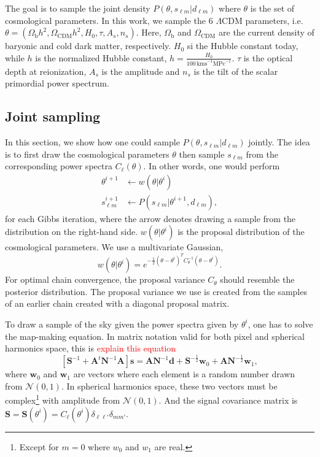 \documentclass[twocolumn]{../common/aa}
\begin{document}
The goal is to sample the joint density $P(\theta, s_{\ell m} | d_{\ell m})$ where $\theta$ is the set of cosmological parameters. In this work, we sample the 6 $\Lambda$CDM parameters, i.e. $\theta=(\Omega_{\textrm{b}}h^2, \Omega_{\textrm{CDM}}h^2, H_0, \tau, A_s, n_s)$. Here, $\Omega_\mathrm{b}$ and $\Omega_\mathrm{CDM}$ are the current density of baryonic and cold dark matter, respectively. $H_0$ si the Hubble constant today, while $h$ is the normalized Hubble constant, $h=\frac{H_0}{100\,\mathrm{km s}^{-1} \mathrm{MPc}^{-1}}$. $\tau$ is the optical depth at reionization, $A_s$ is the amplitude and $n_s$ is the tilt of the scalar primordial power spectrum.

\subsection{Joint sampling}

In this section, we show how one could sample $P(\theta, s_{\ell m} | d_{\ell m})$ jointly. The idea is to first draw the cosmological parameters $\theta$ then sample $s_{\ell m}$ from the corresponding power spectra $C_{\ell}(\theta)$. In other words, one would perform
\begin{align}
    \theta^{i+1} 
 &\leftarrow w(\theta |\theta^i)\\
    s_{\ell m}^{i+1} &\leftarrow P(s_{\ell m} | \theta^{i+1}, d_{\ell m}),
\end{align}
for each Gibbs iteration, where the arrow denotes drawing a sample from the distribution on the right-hand side. $w(\theta |\theta^i)$ is the proposal distribution of the cosmological parameters. We use a multivariate Gaussian,
\begin{equation}
w(\theta |\theta^i) = e^{-\frac12 \left(\theta - \theta^i \right)^T C_{\theta}^{-1}\left(\theta - \theta^i \right)}.
\end{equation}
For optimal chain convergence, the proposal variance $C_{\theta}$ should resemble the posterior distribution. The proposal variance we use is created from the samples of an earlier chain created with a diagonal proposal matrix.

To draw a sample of the sky given the power spectra given by $\theta^i$, one has to solve the map-making equation. In matrix notation valid for both pixel and spherical harmonics space, this is \textcolor{red}{explain this equation}
\begin{equation}
    \label{eq:mapmakingeq}
    \left[\mathbf{S}^{-1} + \mathbf{A}^t \mathbf{N}^{-1}\mathbf{A} \right]\mathbf{s} = \mathbf{A} \mathbf{N}^{-1} \mathbf{d} + \mathbf{S}^{-\frac{1}{2}}\mathbf{w}_0 +\mathbf{A N}^{-\frac{1}{2}}\mathbf{w}_1,
\end{equation}
where $\mathbf{w}_0$ and $\mathbf{w}_1$ are vectors where each element is a random number drawn from $\mathcal{N}(0, 1)$. In spherical harmonics space, these two vectors must be complex\footnote{Except for $m=0$ where $w_0$ and $w_1$ are real.} with amplitude from $\mathcal{N}(0, 1)$. And the signal covariance matrix is $\mathbf{S} = \mathbf{S}(\theta^i) = C_{\ell}\left(\theta^i\right)\delta_{\ell \ell'}\delta_{mm'}$.
\end{document}
